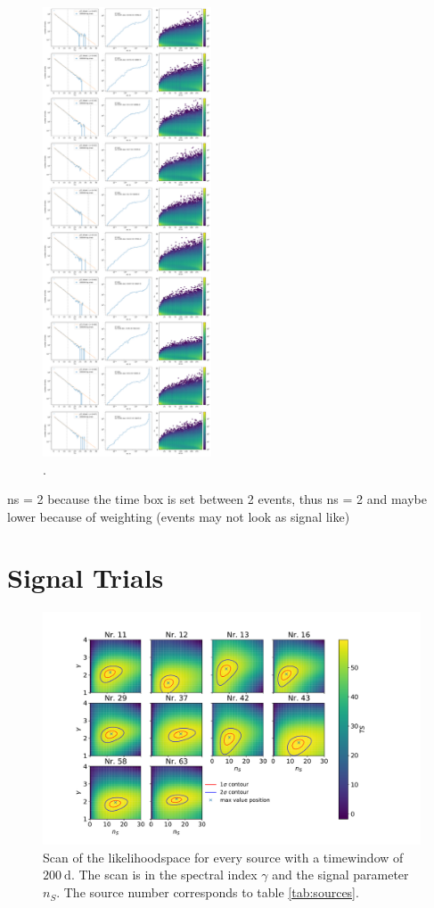 \begin{figure}
    \centering
    \includegraphics[width=5cm]{Plots/05_csky/9_years_gfu_gold_time_dep_bg_timewindows_fixed_t0.pdf}
    \caption{.}
\end{figure}

ns = 2 because the time box is set between 2 events, thus ns = 2 and maybe lower because of weighting (events may not look as signal like)
\section{Signal Trials}

\begin{figure}
    \centering
    \includegraphics[width=\linewidth]{Plots/05_csky/llh_scan.pdf}
    \caption{Scan of the likelihoodspace for every source with a timewindow of $\SI{200}{\day}$. The scan is in the spectral index $\gamma$ and the signal parameter $n_S$. The source number corresponds to table \ref{tab:sources}.}
\end{figure}
